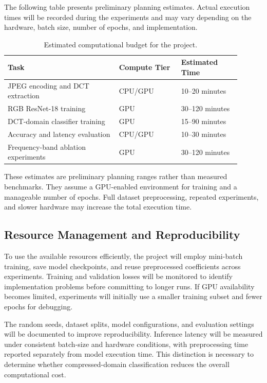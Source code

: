 \documentclass[11pt]{article}
\begin{document}
The following table presents preliminary planning estimates. Actual
execution times will be recorded during the experiments and may vary
depending on the hardware, batch size, number of epochs, and implementation.

\begin{table}[H]
\centering
\caption{Estimated computational budget for the project.}
\label{tab:compute}
\begin{tabular}{@{}p{0.43\linewidth}p{0.24\linewidth}p{0.23\linewidth}@{}}
\toprule
\textbf{Task} & \textbf{Compute Tier} & \textbf{Estimated Time} \\
\midrule
JPEG encoding and DCT extraction
& CPU/GPU & 10--20 minutes \\
RGB ResNet-18 training
& GPU & 30--120 minutes \\
DCT-domain classifier training
& GPU & 15--90 minutes \\
Accuracy and latency evaluation
& CPU/GPU & 10--30 minutes \\
Frequency-band ablation experiments
& GPU & 30--120 minutes \\
\bottomrule
\end{tabular}
\end{table}

These estimates are preliminary planning ranges rather than measured
benchmarks. They assume a GPU-enabled environment for training and a
manageable number of epochs. Full dataset preprocessing, repeated
experiments, and slower hardware may increase the total execution time.

\subsection{Resource Management and Reproducibility}

To use the available resources efficiently, the project will employ
mini-batch training, save model checkpoints, and reuse preprocessed
coefficients across experiments. Training and validation losses will be
monitored to identify implementation problems before committing to longer
runs. If GPU availability becomes limited, experiments will initially
use a smaller training subset and fewer epochs for debugging.

The random seeds, dataset splits, model configurations, and evaluation
settings will be documented to improve reproducibility. Inference latency
will be measured under consistent batch-size and hardware conditions,
with preprocessing time reported separately from model execution time.
This distinction is necessary to determine whether compressed-domain
classification reduces the overall computational cost.
\end{document}

